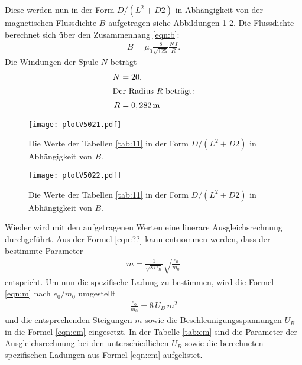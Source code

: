 Diese werden nun in der Form $D/(L^2+D2)$ in Abhängigkeit von der magnetischen Flussdichte $B$ aufgetragen
siehe Abbildungen \ref{fig:11}-\ref{fig:22}.
Die Flussdichte berechnet sich über den Zusammenhang \eqref{eqn:b}:
\begin{align}
  B=\mu_0\frac{8}{\sqrt{125}}\frac{N\,I}{R}.\label{eqn:b}
\end{align}
Die Windungen der Spule $N$ beträgt
\begin{align*}
  N&=20.\\
  \intertext{Der Radius $R$ beträgt:}
R&=0,282\,\si{\meter}
\end{align*}

\begin{figure}
 \centering
 \texttt{[image: plotV5021.pdf]}
 \caption{Die Werte der Tabellen \ref{tab:11}
in der Form $D/(L^2+D2)$ in Abhängigkeit von $B$.}
 \label{fig:11}
\end{figure}


\begin{figure}
 \centering
 \texttt{[image: plotV5022.pdf]}
 \caption{Die Werte der Tabellen \ref{tab:11}
  in der Form $D/(L^2+D2)$ in Abhängigkeit von $B$.}
 \label{fig:22}
\end{figure}

Wieder wird mit den aufgetragenen Werten
eine linerare Ausgleichsrechnung durchgeführt.
Aus der Formel \eqref{eqn:??} kann
entnommen werden, dass
der bestimmte Parameter
\begin{align}
m=\frac{1}{\sqrt{8\,U_B}}\sqrt{\frac{e_0}{m_0}}\label{eqn:m}
\end{align}
entspricht. Um nun die spezifische Ladung zu bestimmen,
 wird die Formel \eqref{eqn:m} nach $e_0/m_0$ umgestellt
\begin{align}
  \frac{e_0}{m_0}=8\,U_B\,m^2 \label{eqn:em}
\end{align}
und die entsprechenden Steigungen $m$ sowie die
Beschleunigungsspannungen $U_B$ in die Formel \eqref{eqn:em}
eingesetzt.
In der Tabelle \ref{tab:em} sind die Parameter der
Ausgleichsrechnung bei den unterschiedlichen $U_B$
sowie die berechneten spezifischen Ladungen aus Formel \eqref{eqn:em}
aufgelistet.


